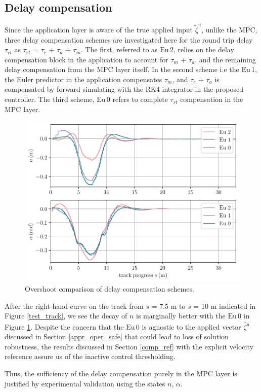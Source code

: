 \subsection{Delay compensation}\label{expr_del_comp}

\par Since the application layer is aware of the true applied input $\tilde{\zeta}^{u}$, unlike the MPC, three delay compensation schemes are investigated here for the round trip delay $\tau_{rt}$ as $\tau_{rt}$ = $\tau_{c}$ + $\tau_{a}$ + $\tau_{m}$. The first, referred to as $\mathrm{Eu}\,2$, relies on the delay compensation block in the application to account for $\tau_{m}$ + $\tau_{a}$, and the remaining delay compensation from the \ac{MPC} layer itself. In the second scheme i.e the $\mathrm{Eu}\,1$, the Euler predictor in the application compensates $\tau_{m}$, and $\tau_{c}$ + $\tau_{a}$ is compensated by forward simulating with the \ac{RK}4 integrator in the proposed controller. The third scheme, $\mathrm{Eu}\,0$ refers to complete $\tau_{rt}$ compensation in the \ac{MPC} layer. 

\begin{figure}[h!tbp]
\includegraphics[width=1\textwidth]{figures/experiments/predictor}
\caption{Overshoot comparison of delay compensation schemes.}\label{fig1_comp_pred}
\end{figure}

\par After the right-hand curve on the track from $s$ = 7.5 m to $s$ = 10 m indicated in Figure \ref{test_track}, we see the decay of $n$ is marginally better with the $\mathrm{Eu}\,0$ in Figure \ref{fig1_comp_pred}. Despite the concern that the $\mathrm{Eu}\,0$ is agnostic to the applied vector $\tilde{\zeta^{u}}$ discussed in Section \ref{appr_oper_safe} that could lead to loss of solution robustness, the results discussed in Section \ref{comp_ref} with the explicit velocity reference assure us of the inactive control thresholding.
\par Thus, the sufficiency of the delay compensation purely in the \ac{MPC} layer is justified by experimental validation using the states $n$, $\alpha$.


